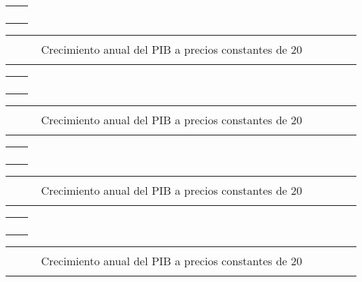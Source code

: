 \documentclass[12pt,letterpaper,twoside]{book}
\newcommand{\guiop}{}
\newcommand{\guicl}{}
\newlength{\distx}
\newcommand{\sectitle}{}
\newcounter{secnumber}[chapter]
\newcommand{\secnew}[1]{\stepcounter{secnumber}\renewcommand{\sectitle}{#1} \section{#1} { \raisebox{0pt}{\begin{titulo-subseccion-blanco} \Bold\large\sectitle\vphantom{p}\end{titulo-subseccion-blanco}}\\[-0.35cm]}}
\newcommand{\secnumbering}{{\large\Bold \thechapter.\thesecnumber}}
\newcommand{\hoja}[1]{\noindent\begin{fondo} #1 \end{fondo}\clearpage}
\newcommand{\cajita}[7]{\checkoddpage\ifoddpage
\begin{bloque-media}
\begin{titulo}
\begin{centrador}
	\begin{tabular}{p{2.5\distx}p{28.8\distx}}
	 & \\[-3mm]	
	 & {\begin{titulo-subseccion}\begin{numero-subseccion}\secnumbering \end{numero-subseccion}  \phantomsection{\secnew{#1}}  \end{titulo-subseccion}}  \\[-5mm]
	 &  \\[-1.3pt]
	\end{tabular}
\end{centrador}
\end{titulo}

\begin{tabular}{p{11\distx}p{21\distx}p{5\distx}}
		\begin{descripcion}
			#2
		\end{descripcion} 
	& 
		\begin{columna-central}
			\begin{subtitulo}
				\centering\footnotesize{\Bold #3} \\
				$\qquad\,\,$#4$\qquad\,\,$
			\end{subtitulo}
	
			\begin{grafica}\centering
				#5
			\end{grafica}
	
			\begin{fuente}
				\footnotesize #6 
			\end{fuente}
		\end{columna-central}
	& 
		\begin{columna-marginal}
			\begin{vacio1}
			
			\end{vacio1}
		
			\begin{nota}
				#7
			\end{nota}
		
			\begin{vacio2}
			
			\end{vacio2}
		\end{columna-marginal}
	\\
\end{tabular}
\end{bloque-media}
\else
\begin{bloque-media}
\begin{titulo}
\begin{centrador-par}
	\begin{tabular}{p{2.5\distx}p{28.8\distx}}
	 & \\[-3mm]	
	 & {\begin{titulo-subseccion}\begin{numero-subseccion}\centering\secnumbering\end{numero-subseccion}  \phantomsection{\secnew{#1}}  \end{titulo-subseccion}}  \\[-5mm]
	 &  \\[-1.3pt]
	\end{tabular}
\end{centrador-par}
\end{titulo}

\begin{tabular}{p{5\distx}p{21.36\distx}p{11\distx}}
		\begin{columna-marginal}
			\begin{vacio1}
			
			\end{vacio1}
		
			\begin{nota}
				#7
			\end{nota}
		
			\begin{vacio2}
			
			\end{vacio2}
		\end{columna-marginal}		
	& 
		\begin{columna-central}
			\begin{subtitulo}
				\centering\footnotesize{\Bold #3} \\
				$\qquad\,\,$#4$\qquad\,\,$
			\end{subtitulo}
	
			\begin{grafica}\centering
				#5
			\end{grafica}
	
			\begin{fuente}
				\footnotesize #6 
			\end{fuente}
		\end{columna-central}
	& 
		\begin{descripcion}
			#2
		\end{descripcion} 
	\\
\end{tabular}
\end{bloque-media}
\fi
}
\begin{document}
\hoja{
	\cajita{Producto Interno Bruto}{}{Crecímiento anual del PIB a precios constantes de 2001Crecimiento anual del PIB a precios constantes de 20}{ Crecimiento anual del PIB a precios constantes de 20}{\ \\[-4mm]\begin{tikzpicture}[x=1pt,y=1pt]
		
		\end{tikzpicture}} {Fuente: Banco de Guatemala \guiop BANGUAT \guicl)}{ }
	
	\cajita{Producto Interno Bruto}{}{Crecimiento anual del PIB a precios constantes de 2001Crecimiento anual del PIB a precios constantes de 20}{ Crecimiento anual del PIB a precios constantes de 20}{\ \\[-4mm]\begin{tikzpicture}[x=1pt,y=1pt]
		
		\end{tikzpicture}} {Fuente: Banco de Guatemala \guiop BANGUAT \guicl)}{ }
	
}






%
\end{document}
